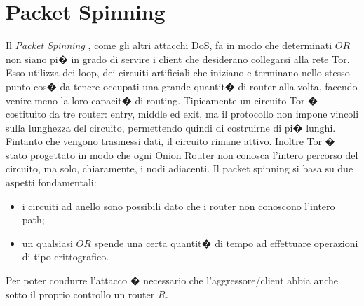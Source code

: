\section{Packet Spinning}
Il \emph{Packet Spinning} \cite{packetspinning}, come gli altri attacchi DoS,
fa in modo che determinati $OR$ non siano pi� in grado di servire i client che desiderano collegarsi alla rete Tor. Esso utilizza dei loop, dei circuiti artificiali che iniziano e terminano nello stesso punto cos� da tenere occupati una grande quantit� di router alla volta, facendo venire meno la loro capacit� di routing.
Tipicamente un circuito Tor � costituito da tre router: entry, middle ed exit, ma il protocollo non impone vincoli sulla lunghezza del circuito, permettendo quindi di costruirne di pi� lunghi. Fintanto che vengono trasmessi dati, il circuito rimane attivo.
Inoltre Tor � stato progettato in modo che ogni Onion Router non conosca l'intero percorso del circuito, ma solo, chiaramente, i nodi adiacenti.
Il packet spinning si basa su due aspetti fondamentali:
\begin{itemize}
\item i circuiti ad anello sono possibili dato che i router non conoscono l'intero path;
\item un qualsiasi $OR$ spende una certa quantit� di tempo ad effettuare operazioni di tipo crittografico.
\end{itemize}
Per poter condurre l'attacco � necessario che l'aggressore/client abbia anche sotto il proprio controllo un router $R_{c}$. 

